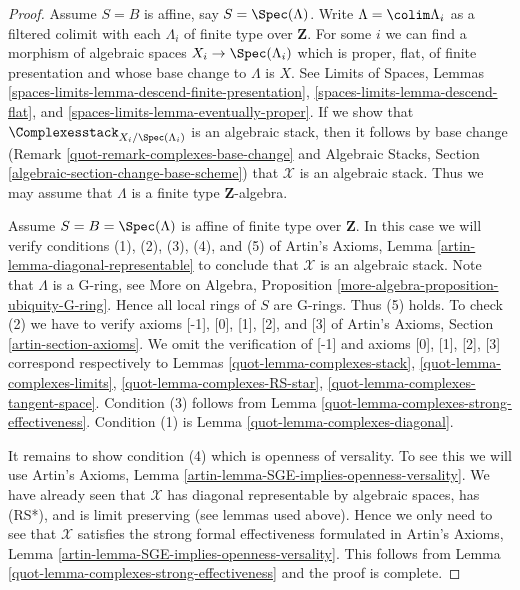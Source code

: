 \begin{proof}
\medskip\noindent
Assume $S = B$ is affine, say $S = \Spec(\Lambda)$.
Write $\Lambda = \colim \Lambda_i$ as a filtered colimit with each $\Lambda_i$
of finite type over $\mathbf{Z}$. For some $i$ we can find
a morphism of algebraic spaces $X_i \to \Spec(\Lambda_i)$
which is proper, flat, of finite presentation and whose base change
to $\Lambda$ is $X$. See Limits of Spaces, Lemmas
\ref{spaces-limits-lemma-descend-finite-presentation},
\ref{spaces-limits-lemma-descend-flat}, and
\ref{spaces-limits-lemma-eventually-proper}.
If we show that $\Complexesstack_{X_i/\Spec(\Lambda_i)}$ is an
algebraic stack, then it follows by base change
(Remark \ref{quot-remark-complexes-base-change} and
Algebraic Stacks, Section \ref{algebraic-section-change-base-scheme})
that $\mathcal{X}$ is an algebraic stack.
Thus we may assume that $\Lambda$ is a finite type $\mathbf{Z}$-algebra.

\medskip\noindent
Assume $S = B = \Spec(\Lambda)$ is affine of finite type over $\mathbf{Z}$.
In this case we will verify conditions (1), (2), (3), (4), and (5) of
Artin's Axioms, Lemma \ref{artin-lemma-diagonal-representable}
to conclude that $\mathcal{X}$ is an algebraic stack.
Note that $\Lambda$ is a G-ring, see
More on Algebra, Proposition \ref{more-algebra-proposition-ubiquity-G-ring}.
Hence all local rings of $S$ are G-rings. Thus (5) holds.
To check (2) we have to verify axioms [-1], [0], [1], [2], and [3]
of Artin's Axioms, Section \ref{artin-section-axioms}.
We omit the verification of [-1] and axioms
[0], [1], [2], [3] correspond respectively to
Lemmas \ref{quot-lemma-complexes-stack},
\ref{quot-lemma-complexes-limits},
\ref{quot-lemma-complexes-RS-star},
\ref{quot-lemma-complexes-tangent-space}.
Condition (3) follows from Lemma \ref{quot-lemma-complexes-strong-effectiveness}.
Condition (1) is Lemma \ref{quot-lemma-complexes-diagonal}.

\medskip\noindent
It remains to show condition (4) which is openness of versality.
To see this we will use
Artin's Axioms, Lemma \ref{artin-lemma-SGE-implies-openness-versality}.
We have already seen that $\mathcal{X}$ has diagonal
representable by algebraic spaces, has (RS*), and is limit preserving
(see lemmas used above).
Hence we only need to see that $\mathcal{X}$ satisfies the strong
formal effectiveness formulated in
Artin's Axioms, Lemma \ref{artin-lemma-SGE-implies-openness-versality}.
This follows from Lemma \ref{quot-lemma-complexes-strong-effectiveness}
and the proof is complete.
\end{proof}



